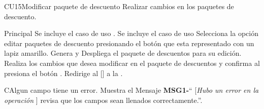 \begin{UseCase}{CU15}{Modificar paquete de descuento}{
		Realizar cambios en los paquetes de descuento.
	}
	\end{UseCase}




	\begin{UCtrayectoria}{Principal}
		\UCpaso Se incluye el caso de uso .
		\UCpaso Se incluye el caso de uso  
		\UCpaso[\UCactor] Selecciona la opción editar paquetes de descuento presionando el botón  que esta representado con un lapiz amarillo.
		\UCpaso Genera y Despliega el paquete de descuentos para su edición. 
		\UCpaso[\UCactor] Realiza los cambios que desea modificar en el paquete de descuentos y confirma al presiona el botón  . 
		\UCpaso Redirige al [\UCactor] a la  .
	\end{UCtrayectoria}




\begin{UCtrayectoriaA}{C}{Algun campo tiene un error.}
			\UCpaso Muestra el Mensaje {\bf MSG1-}`` [{\em Hubo un error en la operación }] revisa que los campos sean llenados correctamente.''.
			
		\end{UCtrayectoriaA}
